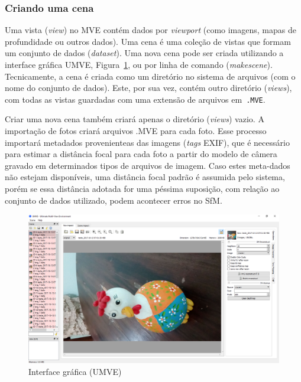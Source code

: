 \subsubsection*{Criando uma cena}

Uma vista (\emph{view}) no MVE contém dados por \emph{viewport} (como imagens,
mapas de profundidade ou outros dados). Uma cena é uma coleção de vistas que
formam um conjunto de dados (\emph{dataset}). Uma nova cena pode ser criada
utilizando a interface gráfica UMVE, Figura~\ref{fig:umve:gui}, ou por linha de
comando (\emph{makescene}).  Tecnicamente, a cena é criada como um diretório no
sistema de arquivos (com o nome do conjunto de dados). Este, por sua vez, contém
outro diretório (\emph{views}), com todas as vistas guardadas com uma extensão
de arquivos em\ \texttt{.MVE}.

Criar uma nova cena também criará apenas o diretório (\emph{views}) vazio. A
importação de fotos criará arquivos .MVE para cada foto. Esse processo importará
metadados provenienteas das imagens (\emph{tags} EXIF), que é necessário para
estimar a distância focal para cada foto a partir do modelo de câmera gravado em
determinados tipos de arquivos de imagem. Caso estes meta-dados não estejam
disponíveis, uma distância focal padrão é assumida pelo sistema, porém se essa
distância adotada for uma péssima suposição, com relação ao conjunto de dados
utilizado, podem acontecer erros no SfM.

\begin{figure}[!h]
	\centering
	\includegraphics[width=\linewidth]{figs/umve1.png}
	\caption{%
	Interface gráfica (UMVE)%
	}\label{fig:umve:gui}
\end{figure}
